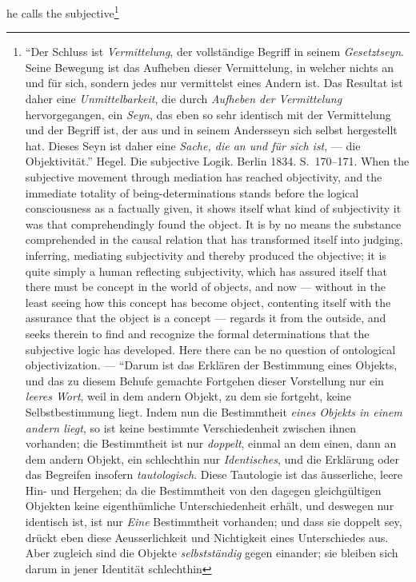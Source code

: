 \documentclass[12pt]{article}
\begin{document}
he calls the subjective\footnote{``Der Schluss ist \emph{Vermittelung}, der
vollständige Begriff in seinem \emph{Gesetztseyn}. Seine Bewegung ist das
Aufheben dieser Vermittelung, in welcher nichts an und für sich, sondern
jedes nur vermittelst eines Andern ist. Das Resultat ist daher eine
\emph{Unmittelbarkeit}, die durch \emph{Aufheben der Vermittelung}
hervorgegangen, ein \emph{Seyn}, das eben so sehr identisch mit der
Vermittelung und der Begriff ist, der aus und in seinem Andersseyn sich
selbst hergestellt hat. Dieses Seyn ist daher eine \emph{Sache, die an und
für sich ist}, --- die Objektivität.'' Hegel. Die subjective Logik. Berlin
1834. S.\ 170--171. When the subjective movement through mediation has
reached objectivity, and the immediate totality of being-determinations
stands before the logical consciousness as a factually given, it shows
itself what kind of subjectivity it was that comprehendingly found the
object. It is by no means the substance comprehended in the causal relation
that has transformed itself into judging, inferring, mediating subjectivity
and thereby produced the objective; it is quite simply a human reflecting
subjectivity, which has assured itself that there must be concept in the
world of objects, and now --- without in the least seeing how this concept
has become object, contenting itself with the assurance that the object is a
concept --- regards it from the outside, and seeks therein to find and
recognize the formal determinations that the subjective logic has developed.
Here there can be no question of ontological objectivization. --- ``Darum
ist das Erklären der Bestimmung eines Objekts, und das zu diesem Behufe
gemachte Fortgehen dieser Vorstellung nur ein \emph{leeres Wort}, weil in
dem andern Objekt, zu dem sie fortgeht, keine Selbstbestimmung liegt. Indem
nun die Bestimmtheit \emph{eines Objekts in einem andern liegt}, so ist
keine bestimmte Verschiedenheit zwischen ihnen vorhanden; die Bestimmtheit
ist nur \emph{doppelt}, einmal an dem einen, dann an dem andern Objekt, ein
schlechthin nur \emph{Identisches}, und die Erklärung oder das Begreifen
insofern \emph{tautologisch}. Diese Tautologie ist das äusserliche, leere
Hin- und Hergehen; da die Bestimmtheit von den dagegen gleichgültigen
Objekten keine eigenthümliche Unterschiedenheit erhält, und deswegen nur
identisch ist, ist nur \emph{Eine} Bestimmtheit vorhanden; und dass sie
doppelt sey, drückt eben diese Aeusserlichkeit und Nichtigkeit eines
Unterschiedes aus. Aber zugleich sind die Objekte \emph{selbstständig} gegen
einander; sie bleiben sich darum in jener Identität schlechthin
}
\end{document}
